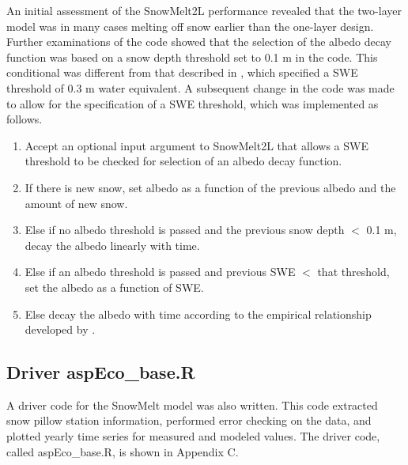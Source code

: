 \documentclass[12pt]{article}
\begin{document}
An initial assessment of the SnowMelt2L performance revealed that the two-layer model was in many cases melting off snow earlier than the one-layer design.
Further examinations of the code showed that the selection of the albedo decay function was based on a snow depth threshold set to 0.1 m in the code.
This conditional was different from that described in \citep{walter2005process}, which specified a SWE threshold of 0.3 m water equivalent.
A subsequent change in the code was made to allow for the specification of a SWE threshold, which was implemented as follows.
\begin{enumerate}
  \item Accept an optional input argument to SnowMelt2L that allows a SWE threshold to be checked for selection of an albedo decay function.
  \item If there is new snow, set albedo as a function of the previous albedo and the amount of new snow.
  \item Else if no albedo threshold is passed and the previous snow depth $<$ 0.1 m, decay the albedo linearly with time.
  \item Else if an albedo threshold is passed and previous SWE $<$ that threshold, set the albedo as a function of SWE.
  \item Else decay the albedo with time according to the empirical relationship developed by \citet{armycorps1960runoff}.
\end{enumerate}

\subsection{Driver aspEco\_base.R}
A driver code for the SnowMelt model was also written.
This code extracted snow pillow station information, performed error checking on the data, and plotted yearly time series for measured and modeled values.
The driver code, called aspEco\_base.R, is shown in Appendix C.
\end{document}
